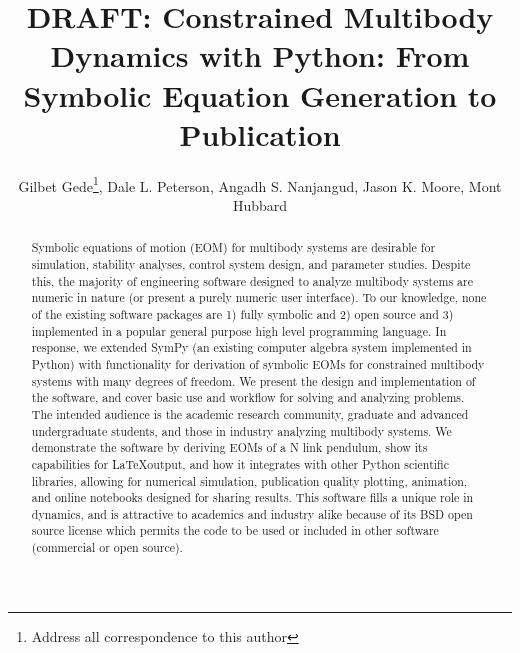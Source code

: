 \documentclass[twocolumn,10pt]{asme2e}
\title{DRAFT: Constrained Multibody Dynamics with Python: From Symbolic
Equation Generation to Publication}
\author{Gilbet Gede\thanks{Address all correspondence to this author}, Dale L.
Peterson, Angadh S. Nanjangud, Jason K. Moore, Mont Hubbard
  \affiliation{
    Sports Biomechanics Laboratory\\
    Department of Mechanical and Aerospace Engineering\\
    University of California\\
    Davis, California 95616\\
    Email: \{ggede, dlpeterson, asnanjangud, jkmoor, mhubbard\}@ucdavis.edu
  }
}
\begin{document}
\maketitle

\begin{abstract}
Symbolic equations of motion (EOM) for multibody systems are desirable for
simulation, stability analyses, control system design, and parameter studies.
Despite this, the majority of engineering software designed to analyze
multibody systems are numeric in nature (or present a purely numeric user
interface). To our knowledge, none of the existing software packages are 1) fully
symbolic and 2) open source and 3) implemented in a popular general purpose
high level programming language.
In response, we extended SymPy (an existing computer algebra system implemented
in Python) with functionality for derivation of symbolic EOMs for constrained
multibody systems with many degrees of freedom.
We present the design and implementation of the software, and cover basic use
and workflow for solving and analyzing problems.  The intended audience is the
academic research community, graduate and advanced undergraduate students, and
those in industry analyzing multibody systems.
We demonstrate the software by deriving EOMs of a N link pendulum, show its
capabilities for \LaTeX output, and how it integrates with other Python
scientific libraries, allowing for numerical simulation, publication quality
plotting, animation, and online notebooks designed for sharing results.
This software fills a unique role in dynamics, and is attractive to academics
and industry alike because of its BSD open source license which permits the
code to be used or included in other software (commercial or open source).
\end{abstract}

\end{document}

